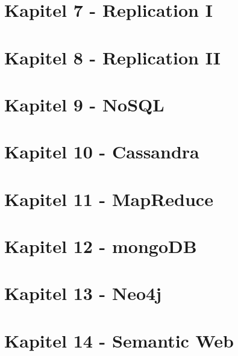 \documentclass[a4paper,11pt]{article}
\begin{document}
\section{Kapitel 7 - Replication I}
\section{Kapitel 8 - Replication II}
\section{Kapitel 9 - NoSQL}
\section{Kapitel 10 - Cassandra}
\section{Kapitel 11 - MapReduce}
\section{Kapitel 12 - mongoDB}
\section{Kapitel 13 - Neo4j}
\section{Kapitel 14 - Semantic Web}
\end{document}
